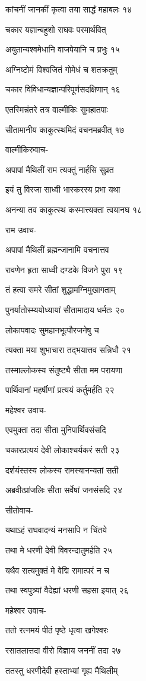 कांचनीं जानकीं कृत्वा तया सार्द्धं महाबलः १४

चकार यज्ञान्बहुशो राघवः परमार्थवित्

अयुतान्यश्वमेधानि वाजपेयानि च प्रभुः १५

अग्निष्टोमं विश्वजितं गोमेधं च शतक्रतुम्

चकार विविधान्यज्ञान्परिपूर्णसदक्षिणान् १६

एतस्मिन्नंतरे तत्र वाल्मीकिः सुमहातपाः

सीतामानीय काकुत्स्थमिदं वचनमब्रवीत् १७

वाल्मीकिरुवाच-

अपापां मैथिलीं राम त्यक्तुं नार्हसि सुव्रत

इयं तु विरजा साध्वी भास्करस्य प्रभा यथा

अनन्या तव काकुत्स्थ कस्मात्त्यक्ता त्वयानघ १८

राम उवाच-

अपापां मैथिलीं ब्रह्मन्जानामि वचनात्तव

रावणेन हृता साध्वी दण्डके विजने पुरा १९

तं हत्वा समरे सीतां शुद्धामग्निमुखागताम्

पुनर्यातोस्म्ययोध्यायां सीतामादाय धर्मतः २०

लोकापवादः सुमहानभूत्पौरजनेषु च

त्यक्ता मया शुभाचारा तद्भयात्तव सन्निधौ २१

तस्माल्लोकस्य संतुष्ट्यै सीता मम परायणा

पार्थिवानां महर्षीणां प्रत्ययं कर्तुमर्हति २२

महेश्वर उवाच-

एवमुक्ता तदा सीता मुनिपार्थिवसंसदि

चकारप्रत्ययं देवी लोकाश्चर्यकरं सती २३

दर्शयंस्तस्य लोकस्य रामस्यानन्यतां सती

अब्रवीत्प्रांजलिः सीता सर्वेषां जनसंसदि २४

सीतोवाच-

यथाऽहं राघवादन्यं मनसापि न चिंतये

तथा मे धरणी देवी विवरन्दातुमर्हति २५

यथैव सत्यमुक्तं मे वेद्मि रामात्परं न च

तथा स्वपुत्र्यां वैदेह्यां धरणी सहसा इयात् २६

महेश्वर उवाच-

ततो रत्नमयं पीठं पृष्ठे धृत्वा खगेश्वरः

रसातलात्तदा वीरो विज्ञाय जननीं तदा २७

ततस्तु धरणीदेवी हस्ताभ्यां गृह्य मैथिलीम्

